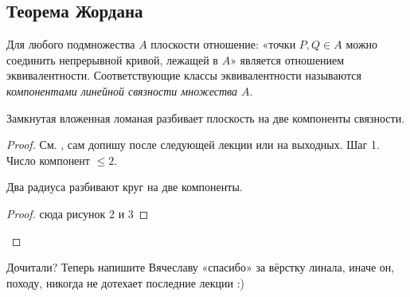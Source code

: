 \subsection{Теорема Жордана}
\begin{definition}
    Для любого подмножества $A$ плоскости отношение: «точки $P,Q \in A$ можно соединить непрерывной кривой, лежащей в $A$» является отношением эквивалентности. Соответствующие классы эквивалентности называются \textit{компонентами линейной связности множества $A$}.
\end{definition}

\begin{theorem}
    Замкнутая вложенная ломаная разбивает плоскость на две компоненты связности. %
\end{theorem}
\begin{proof}
    См. \cite{oshemkov}, сам допишу после следующей лекции или на выходных.
    Шаг 1. Число компонент $\leq 2$.
    \begin{lemma}
        Два радиуса разбивают круг на две компоненты.
    \end{lemma}
    \begin{proof}
        сюда рисунок 2 и 3
    \end{proof}
\end{proof}

Дочитали? Теперь напишите Вячеславу «спасибо» за вёрстку линала, иначе он, походу, никогда не дотехает последние лекции :)